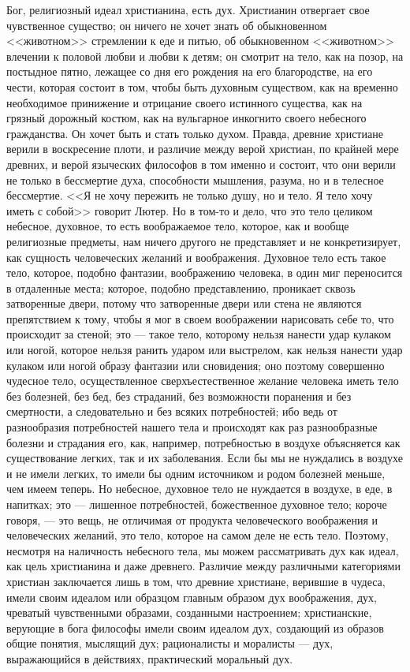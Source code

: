 \documentclass[12pt]{article}
\begin{document}
Бог, религиозный идеал христианина, есть дух. Христианин отвергает свое чувственное существо; он ничего не хочет знать об обыкновенном <<животном>> стремлении к еде и питью, об обыкновенном <<животном>> влечении к половой любви и любви к детям; он смотрит на тело, как на позор, на постыдное пятно, лежащее со дня его рождения на его благородстве, на его чести, которая состоит в том, чтобы быть духовным существом, как на временно необходимое принижение и отрицание своего истинного существа, как на грязный дорожный костюм, как на вульгарное инкогнито своего небесного гражданства. Он хочет быть и стать только духом. Правда, древние христиане верили в воскресение плоти, и различие между верой христиан, по крайней мере древних, и верой языческих философов в том именно и состоит, что они верили не только в бессмертие духа, способности мышления, разума, но и в телесное бессмертие. <<Я не хочу пережить не только душу, но и тело. Я тело хочу иметь с собой>>  говорит Лютер. Но в том-то и дело, что это тело целиком небесное, духовное, то есть воображаемое тело, которое, как и вообще религиозные предметы, нам ничего другого не представляет и не конкретизирует, как сущность человеческих желаний и воображения. Духовное тело есть такое тело, которое, подобно фантазии, воображению человека, в один миг переносится в отдаленные места; которое, подобно представлению, проникает сквозь затворенные двери, потому что затворенные двери или стена не являются препятствием к тому, чтобы я мог в своем воображении нарисовать себе то, что происходит за стеной; это --- такое тело, которому нельзя нанести удар кулаком или ногой, которое нельзя ранить ударом или выстрелом, как нельзя нанести удар кулаком или ногой образу фантазии или сновидения; оно поэтому совершенно чудесное тело, осуществленное сверхъестественное желание человека иметь тело без болезней, без бед, без страданий, без возможности поранения и без смертности, а следовательно и без всяких потребностей; ибо ведь от разнообразия потребностей нашего тела и происходят как раз разнообразные болезни и страдания его, как, например, потребностью в воздухе объясняется как существование легких, так и их заболевания. Если бы мы не нуждались в воздухе и не имели легких, то имели бы одним источником и родом болезней меньше, чем имеем теперь. Но небесное, духовное тело не нуждается в воздухе, в еде, в напитках; это --- лишенное потребностей, божественное духовное тело; короче говоря, --- это вещь, не отличимая от продукта человеческого воображения и человеческих желаний, это тело, которое на самом деле не есть тело. Поэтому, несмотря на наличность небесного тела, мы можем рассматривать дух как идеал, как цель христианина и даже древнего. Различие между различными категориями христиан заключается лишь в том, что древние христиане, верившие в чудеса, имели своим идеалом или образцом главным образом дух воображения, дух, чреватый чувственными образами, созданными настроением; христианские, верующие в бога философы имели своим идеалом дух, создающий из образов общие понятия, мыслящий дух; рационалисты и моралисты --- дух, выражающийся в действиях, практический моральный дух. 
\end{document}
